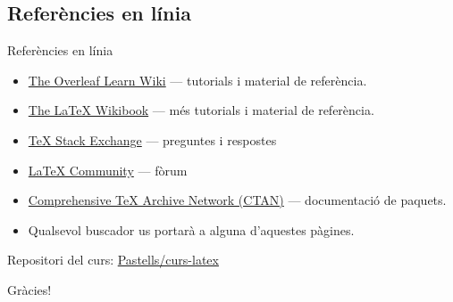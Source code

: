 \subsection{Referències en línia}
\begin{frame}{Referències en línia}
\begin{itemize}
\item \href{https://www.overleaf.com/learn}{The Overleaf Learn Wiki} --- tutorials i material de referència.
\item \href{http://en.wikibooks.org/wiki/LaTeX}{The \LaTeX{} Wikibook} --- més tutorials i material de referència.
\item \href{http://tex.stackexchange.com/}{\TeX{} Stack Exchange} --- preguntes i respostes
\item \href{http://www.latex-community.org/}{\LaTeX{} Community} --- fòrum
\item \href{http://ctan.org/}{Comprehensive \TeX{} Archive Network (CTAN)} --- documentació de paquets.
\item Qualsevol buscador us portarà a alguna d'aquestes pàgines.
\end{itemize}

Repositori del curs: \href{https://github.com/Pastells/curs-latex}{Pastells/curs-latex}
\end{frame}


\begin{frame}[standout]
\Huge Gràcies!
\end{frame}


